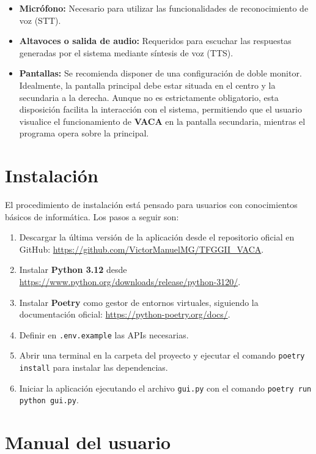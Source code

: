 \begin{itemize}
    \item \textbf{Micrófono:} Necesario para utilizar las funcionalidades de reconocimiento de voz (STT).
    \item \textbf{Altavoces o salida de audio:} Requeridos para escuchar las respuestas generadas por el sistema mediante síntesis de voz (TTS).
    \item \textbf{Pantallas:} Se recomienda disponer de una configuración de doble monitor. Idealmente, la pantalla principal debe estar situada en el centro y la secundaria a la derecha. Aunque no es estrictamente obligatorio, esta disposición facilita la interacción con el sistema, permitiendo que el usuario visualice el funcionamiento de \textbf{VACA} en la pantalla secundaria, mientras el programa opera sobre la principal.
\end{itemize}

\section{Instalación}
El procedimiento de instalación está pensado para usuarios con conocimientos básicos de informática. Los pasos a seguir son:

\begin{enumerate}
    \item Descargar la última versión de la aplicación desde el repositorio oficial en GitHub: \url{https://github.com/VictorManuelMG/TFGGII_VACA}. \cite{VACARepo}
    \item Instalar \textbf{Python 3.12} desde \url{https://www.python.org/downloads/release/python-3120/}.\cite{python312}
    \item Instalar \textbf{Poetry} como gestor de entornos virtuales, siguiendo la documentación oficial: \url{https://python-poetry.org/docs/}.\cite{poetryDocs}
    \item Definir en \texttt{.env.example} las APIs necesarias.
    \item Abrir una terminal en la carpeta del proyecto y ejecutar el comando \texttt{poetry install} para instalar las dependencias.
    \item Iniciar la aplicación ejecutando el archivo \texttt{gui.py} con el comando \texttt{poetry run python gui.py}.
\end{enumerate}

\section{Manual del usuario}

